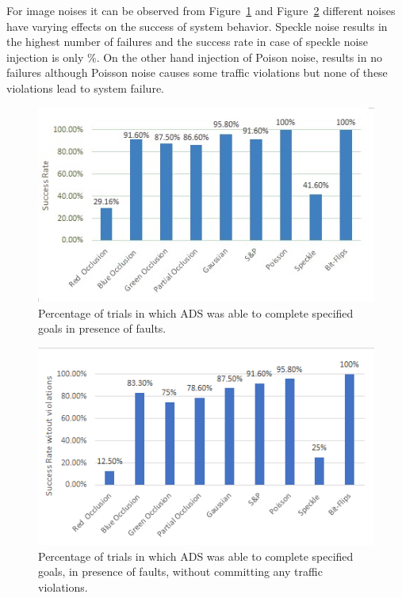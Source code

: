 For image noises it can be observed from Figure~\ref{fig:success_rate} and Figure~\ref{fig:no_violations} different noises have varying effects on the success of system behavior. Speckle noise results in the highest number of failures and the success rate in case of speckle noise injection is only \%. On the other hand injection of Poison noise, results in no failures although Poisson noise causes some traffic violations but none of these violations lead to system failure.

\begin{figure}
	\vspace{-0.5em}
	\centering
	\includegraphics[scale=0.7]{success_rate}
	\vspace{-0.5em}
	\caption{Percentage of trials in which ADS was able to complete specified goals in presence of faults.}
	\label{fig:success_rate}
	\vspace{-1.5em}
\end{figure}

\begin{figure}  
	\vspace{1.0em}
	\centering
	\includegraphics[scale=0.7]{no_violations}
	\vspace{-0.5em}
	\caption{Percentage of trials in which ADS was able to complete specified goals, in presence of faults, without committing any traffic violations.}
	\label{fig:no_violations}
	\vspace{-1.5em}
\end{figure}






